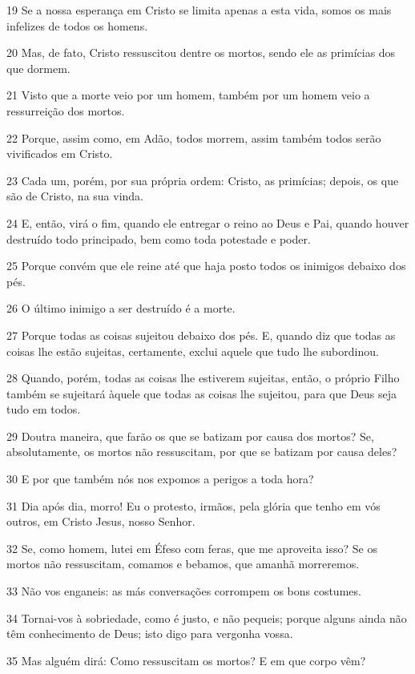 \par 19 Se a nossa esperança em Cristo se limita apenas a esta vida, somos os mais infelizes de todos os homens.
\par 20 Mas, de fato, Cristo ressuscitou dentre os mortos, sendo ele as primícias dos que dormem.
\par 21 Visto que a morte veio por um homem, também por um homem veio a ressurreição dos mortos.
\par 22 Porque, assim como, em Adão, todos morrem, assim também todos serão vivificados em Cristo.
\par 23 Cada um, porém, por sua própria ordem: Cristo, as primícias; depois, os que são de Cristo, na sua vinda.
\par 24 E, então, virá o fim, quando ele entregar o reino ao Deus e Pai, quando houver destruído todo principado, bem como toda potestade e poder.
\par 25 Porque convém que ele reine até que haja posto todos os inimigos debaixo dos pés.
\par 26 O último inimigo a ser destruído é a morte.
\par 27 Porque todas as coisas sujeitou debaixo dos pés. E, quando diz que todas as coisas lhe estão sujeitas, certamente, exclui aquele que tudo lhe subordinou.
\par 28 Quando, porém, todas as coisas lhe estiverem sujeitas, então, o próprio Filho também se sujeitará àquele que todas as coisas lhe sujeitou, para que Deus seja tudo em todos.
\par 29 Doutra maneira, que farão os que se batizam por causa dos mortos? Se, absolutamente, os mortos não ressuscitam, por que se batizam por causa deles?
\par 30 E por que também nós nos expomos a perigos a toda hora?
\par 31 Dia após dia, morro! Eu o protesto, irmãos, pela glória que tenho em vós outros, em Cristo Jesus, nosso Senhor.
\par 32 Se, como homem, lutei em Éfeso com feras, que me aproveita isso? Se os mortos não ressuscitam, comamos e bebamos, que amanhã morreremos.
\par 33 Não vos enganeis: as más conversações corrompem os bons costumes.
\par 34 Tornai-vos à sobriedade, como é justo, e não pequeis; porque alguns ainda não têm conhecimento de Deus; isto digo para vergonha vossa.
\par 35 Mas alguém dirá: Como ressuscitam os mortos? E em que corpo vêm?
